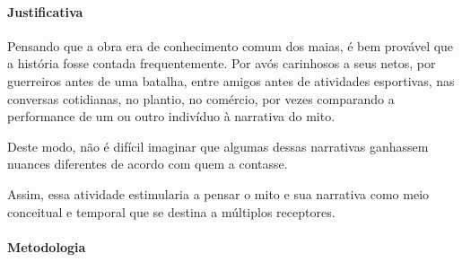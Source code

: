 \documentclass[12pt]{extarticle}
\begin{document}
\paragraph{Justificativa} Pensando que a obra era de conhecimento comum dos maias, é
bem provável que a história fosse contada frequentemente. Por avós
carinhosos a seus netos, por guerreiros antes de uma batalha, entre
amigos antes de atividades esportivas, nas conversas cotidianas, no
plantio, no comércio, por vezes comparando a performance de um ou outro
indivíduo à narrativa do mito.

Deste modo, não é difícil imaginar que algumas dessas narrativas
ganhassem nuances diferentes de acordo com quem a contasse.

Assim, essa atividade estimularia a pensar o mito e sua narrativa como meio conceitual 
e temporal que se destina a múltiplos receptores.

\paragraph{Metodologia} 
\end{document}
